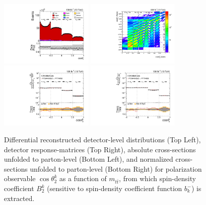 \clearpage
\begin{figure}[htb]
\begin{center}
 \includegraphics[width=0.40\textwidth]{fig_fullRun2UL/controlplots/combined/Hyp_LeptonBk_vs_TTBarMass.pdf}
 \includegraphics[width=0.40\textwidth]{fig_fullRun2UL/unfolding/combined/ResponseMatrix_b2k_mttbar.pdf} \\
 \includegraphics[width=0.40\textwidth]{fig_fullRun2UL/unfolding/combined/UnfoldedResults_b2k_mttbar.pdf}
 \includegraphics[width=0.40\textwidth]{fig_fullRun2UL/unfolding/combined/UnfoldedResultsNorm_b2k_mttbar.pdf} \\
\label{fig:b2k_mttbar}
\caption{Differential reconstructed detector-level distributions (Top Left), detector response-matrices (Top Right), absolute cross-sections unfolded to parton-level (Bottom Left), and normalized cross-sections unfolded to parton-level (Bottom Right) for polarization observable $\cos\theta_{2}^{k}$ as a function of $m_{t\bar{t}}$, from which spin-density coefficient $B_{2}^{k}$ (sensitive to spin-density coefficient function $b_k^{-}$) is extracted.}
\end{center}
\end{figure}
